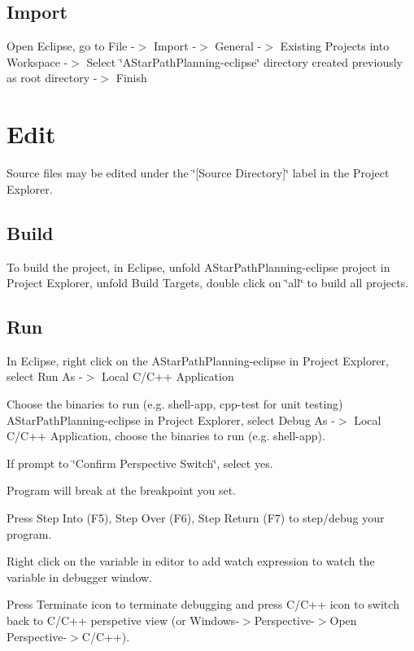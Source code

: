 \subsection*{Import}

Open Eclipse, go to File -\/$>$ Import -\/$>$ General -\/$>$ Existing Projects into Workspace -\/$>$ Select \char`\"{}\+A\+Star\+Path\+Planning-\/eclipse\char`\"{} directory created previously as root directory -\/$>$ Finish

\section*{Edit}

Source files may be edited under the \char`\"{}\mbox{[}\+Source Directory\mbox{]}\char`\"{} label in the Project Explorer.

\subsection*{Build}

To build the project, in Eclipse, unfold A\+Star\+Path\+Planning-\/eclipse project in Project Explorer, unfold Build Targets, double click on \char`\"{}all\char`\"{} to build all projects.

\subsection*{Run}


\begin{DoxyEnumerate}
\item In Eclipse, right click on the A\+Star\+Path\+Planning-\/eclipse in Project Explorer, select Run As -\/$>$ Local C/\+C++ Application
\item Choose the binaries to run (e.\+g. shell-\/app, cpp-\/test for unit testing) A\+Star\+Path\+Planning-\/eclipse in Project Explorer, select Debug As -\/$>$ Local C/\+C++ Application, choose the binaries to run (e.\+g. shell-\/app).
\item If prompt to \char`\"{}\+Confirm Perspective Switch\char`\"{}, select yes.
\item Program will break at the breakpoint you set.
\item Press Step Into (F5), Step Over (F6), Step Return (F7) to step/debug your program.
\item Right click on the variable in editor to add watch expression to watch the variable in debugger window.
\item Press Terminate icon to terminate debugging and press C/\+C++ icon to switch back to C/\+C++ perspetive view (or Windows-\/$>$Perspective-\/$>$Open Perspective-\/$>$C/\+C++).
\end{DoxyEnumerate}

